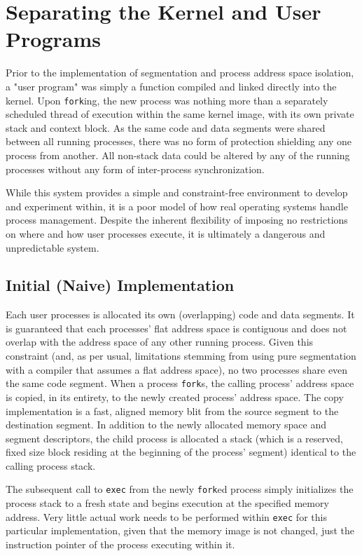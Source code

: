 \documentclass[titlepage]{article}
\begin{document}
\section{Separating the Kernel and User Programs}

Prior to the implementation of segmentation and process address space
isolation, a "user program" was simply a function compiled and linked
directly into the kernel. Upon \verb!fork!ing, the new process was nothing
more than a separately scheduled thread of execution within the same kernel
image, with its own private stack and context block. As the same code and data
segments were shared between all running processes, there was no form of
protection shielding any one process from another. All non-stack data could
be altered by any of the running processes without any form of inter-process
synchronization.

While this system provides a simple and constraint-free environment to develop
and experiment within, it is a poor model of how real operating systems handle
process management. Despite the inherent flexibility of imposing no restrictions
on where and how user processes execute, it is ultimately a dangerous and
unpredictable system. 

\subsection{Initial (Naive) Implementation}

Each user processes is allocated its own (overlapping) code and data segments.
It is guaranteed that each processes' flat address space is contiguous and does
not overlap with the address space of any other running process. Given this
constraint (and, as per usual, limitations stemming from using pure segmentation
with a compiler that assumes a flat address space), no two processes share even
the same code segment. When a process \verb!fork!s, the calling process' address
space is copied, in its entirety, to the newly created process' address space.
The copy implementation is a fast, aligned memory blit from the source segment
to the destination segment. In addition to the newly allocated memory space and
segment descriptors, the child process is allocated a stack (which is a
reserved, fixed size block residing at the beginning of the process' segment)
identical to the calling process stack.

The subsequent call to \verb!exec! from the newly \verb!fork!ed process simply
initializes the process stack to a fresh state and begins execution at the
specified memory address. Very little actual work needs to be performed within
\verb!exec! for this particular implementation, given that the memory image is
not changed, just the instruction pointer of the process executing within it.
\end{document}
